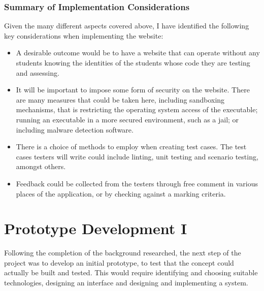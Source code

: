 \documentclass[a4paper,11pt]{report}
\begin{document}
\subsection{Summary of Implementation Considerations}
Given the many different aspects covered above, I have identified the following key considerations when implementing the website:
\begin{itemize}
 \item A desirable outcome would be to have a website that can operate without any students knowing the identities of the students whose code they are testing and assessing.
 \item It will be important to impose some form of security on the website. There are many measures that could be taken here, including sandboxing mechanisms, that is restricting the operating system access of the executable; running an executable in a more secured environment, such as a jail; or including malware detection software.
 \item There is a choice of methods to employ when creating test cases. The test cases testers will write could include linting, unit testing and scenario testing, amongst others.
 \item Feedback could be collected from the testers through free comment in various places of the application, or by checking against a marking criteria.
\end{itemize}


\chapter{Prototype Development I}
\label{ch:proto1}
Following the completion of the background researched, the next step of the project was to develop an initial prototype, to test that the concept could actually be built and tested. This would require identifying and choosing suitable technologies, designing an interface and designing and implementing a system.
\end{document}
